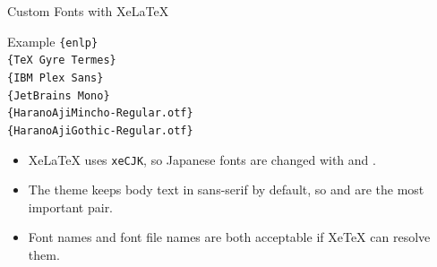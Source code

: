 \documentclass[10pt]{beamer}
\begin{document}
\begin{frame}{Custom Fonts with XeLaTeX}
\begin{block}{Example}
\small
\texttt{\string\usetheme\{enlp\}}\\
\texttt{\string\setmainfont\{TeX Gyre Termes\}}\\
\texttt{\string\setsansfont\{IBM Plex Sans\}}\\
\texttt{\string\setmonofont\{JetBrains Mono\}}\\
\texttt{\string\setCJKmainfont[BoldFont=HaranoAjiMincho-Bold.otf]\{HaranoAjiMincho-Regular.otf\}}\\
\texttt{\string\setCJKsansfont[BoldFont=HaranoAjiGothic-Bold.otf]\{HaranoAjiGothic-Regular.otf\}}
\end{block}
  \begin{itemize}
    \item XeLaTeX uses \texttt{xeCJK}, so Japanese fonts are changed with \texttt{\string\setCJKmainfont} and \texttt{\string\setCJKsansfont}.
    \item The theme keeps body text in sans-serif by default, so \texttt{\string\setsansfont} and \texttt{\string\setCJKsansfont} are the most important pair.
    \item Font names and font file names are both acceptable if XeTeX can resolve them.
  \end{itemize}
\end{frame}
\end{document}
